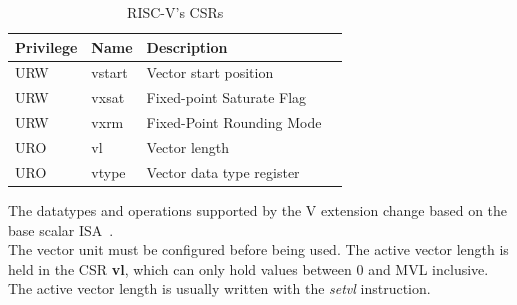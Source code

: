 \begin{table}[H]
    \centering
    \begin{tabular}{|l|l|l|l|}
        \hline
        Privilege & Name   & Description               \\ \hline
        URW       & vstart & Vector start position     \\ \hline
        URW       & vxsat  & Fixed-point Saturate Flag \\ \hline
        URW       & vxrm   & Fixed-Point Rounding Mode \\ \hline
        URO       & vl     & Vector length             \\ \hline
        URO       & vtype  & Vector data type register \\ \hline
    \end{tabular}
    \caption{RISC-V's CSRs}
    \label{CSRs}
\end{table}

The datatypes and operations supported by the V extension change based on the
base scalar ISA~\cite{riscv-v-specs}.\\


The vector unit must be conﬁgured before being used. 
The active vector length is held in the CSR \textbf{vl}, which can only hold values between 0 and MVL inclusive.
The active vector length is usually written with the \emph{setvl} instruction.

